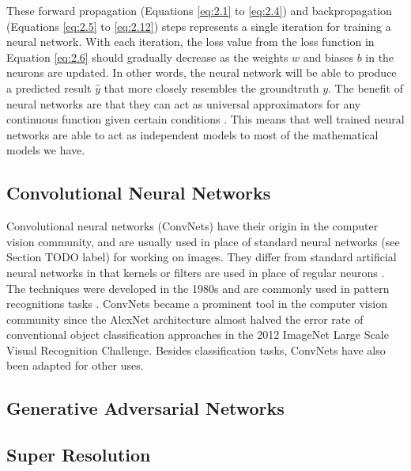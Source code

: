 These forward propagation (Equations \eqref{eq:2.1} to \eqref{eq:2.4}) and backpropagation (Equations \eqref{eq:2.5} to \eqref{eq:2.12}) steps represents a single iteration for training a neural network.
With each iteration, the loss value from the loss function in Equation \eqref{eq:2.6} should gradually decrease as the weights $w$ and biases $b$ in the neurons are updated.
In other words, the neural network will be able to produce a predicted result $\hat{y}$ that more closely resembles the groundtruth $y$.
The benefit of neural networks are that they can act as universal approximators for any continuous function given certain conditions \citep{LeshnoMultilayerfeedforwardnetworks1993}.
This means that well trained neural networks are able to act as independent models to most of the mathematical models we have.

\subsection{Convolutional Neural Networks}

Convolutional neural networks (\gls{ConvNets}) have their origin in the computer vision community, and are usually used in place of standard neural networks (see Section TODO label) for working on images.
They differ from standard artificial neural networks in that kernels or filters are used in place of regular neurons \citep[see][for a review]{LeCunDeeplearning2015}.
The techniques were developed in the 1980s \citep{FukushimaNeocognitronnewalgorithm1982,LeCunBackpropagationAppliedHandwritten1989} and are commonly used in pattern recognitions tasks \citep[e.g.][]{LecunGradientbasedlearningapplied1998}.
\gls{ConvNets} became a prominent tool in the computer vision community since the AlexNet architecture \citep{KrizhevskyImageNetclassificationdeep2017} almost halved the error rate of conventional object classification approaches in the 2012 ImageNet Large Scale Visual Recognition Challenge.
Besides classification tasks, \gls{ConvNets} have also been adapted for other uses.

\subsection{Generative Adversarial Networks}

\subsection{Super Resolution}
